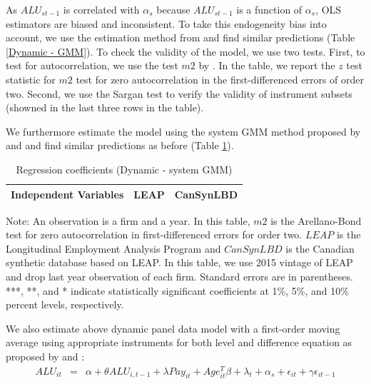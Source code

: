 As $ALU_{st-1}$ is correlated with $\alpha_{s}$ because $ALU_{st-1}$ is a function of $\alpha_{s}$, OLS estimators are biased and inconsistent. 
To take this endogeneity bias into account, we use the estimation method from \textcite{RePEc:oup:restud:v:58:y:1991:i:2:p:277-297.} and find similar predictions (Table \ref{Dynamic - GMM}). To check the validity of the model, we use two tests. First, to test for autocorrelation, we use the test $m2$ by \textcite{RePEc:oup:restud:v:58:y:1991:i:2:p:277-297.}. In the table, we report the $z$ test statistic for $m2$ test for zero autocorrelation in the  first-differenced errors of order two. Second, we use the Sargan test to verify the validity of instrument subsets (showned in the last three rows in the table).

We furthermore estimate the model using the system GMM  method proposed by \textcite{RePEc:eee:econom:v:68:y:1995:i:1:p:29-51} and \textcite{RePEc:eee:econom:v:87:y:1998:i:1:p:115-143} and find similar predictions as before (Table \ref{Dynamic - system GMM}). 

\begin{table}[H]
  \centering
\begin{threeparttable}
 \caption{Regression coefficients (Dynamic - system GMM)} \label{Dynamic - system GMM} \medskip
\renewcommand{\arraystretch}{1}
\begin{tabular}{l|c c| c c}
\toprule
\textbf{Independent Variables}&\multicolumn{2}{c|}{\textbf{LEAP}} &  \multicolumn{2}{c}{\textbf{CanSynLBD}}\\
\midrule

   \bottomrule
  \end{tabular} 
\begin{tablenotes}
\small
\item Note: An observation is a firm and a year. In this table, $m2$ is the Arellano-Bond test for zero autocorrelation in first-differenced errors for order two. $LEAP$ is the Longitudinal Employment Analysis Program and $CanSynLBD$ is the Canadian synthetic database based on LEAP. In this table, we use 2015 vintage of LEAP and drop last year observation of each firm. Standard errors are in parentheses. ***, **, and * indicate statistically significant coefficients at 1\%, 5\%, and 10\% percent levels, respectively.
 \end{tablenotes}
 \end{threeparttable}
\end{table}

We also estimate above dynamic panel data model with a first-order moving average using appropriate instruments for both level and difference equation as proposed by \textcite{RePEc:eee:econom:v:68:y:1995:i:1:p:29-51} and \textcite{RePEc:eee:econom:v:87:y:1998:i:1:p:115-143}:
\begin{eqnarray}	
ALU_{it}&=&\alpha +\theta ALU_{i,t-1}+\lambda Pay_{it}+Age_{it}^{T}\beta+\lambda_t+\alpha_s+\epsilon_{it}+\gamma\epsilon_{it-1}
\end{eqnarray}

